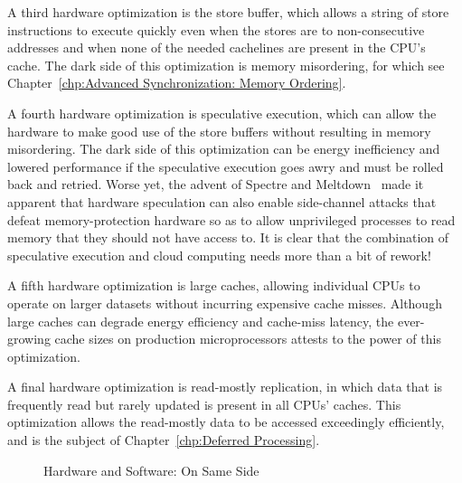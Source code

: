 A third hardware optimization is the store buffer, which allows a string
of store instructions to execute quickly even when the stores are to
non-consecutive addresses and when none of the needed cachelines are
present in the CPU's cache.
The dark side of this optimization is memory misordering, for which see
Chapter~\ref{chp:Advanced Synchronization: Memory Ordering}.

A fourth hardware optimization is speculative execution, which can
allow the hardware to make good use of the store buffers without
resulting in memory misordering.
The dark side of this optimization can be energy inefficiency and
lowered performance if the speculative execution goes awry and must
be rolled back and retried.
Worse yet, the advent of
Spectre and Meltdown~\cite{JannHorn2018MeltdownSpectre}
made it apparent that hardware speculation can also enable side-channel
attacks that defeat memory-protection hardware so as to allow unprivileged
processes to read memory that they should not have access to.
It is clear that the combination of speculative execution and cloud
computing needs more than a bit of rework!

A fifth hardware optimization is large caches, allowing individual
CPUs to operate on larger datasets without incurring expensive cache
misses.
Although large caches can degrade energy efficiency and cache-miss
latency, the ever-growing cache sizes on production microprocessors
attests to the power of this optimization.

A final hardware optimization is read-mostly replication, in which
data that is frequently read but rarely updated is present in all
CPUs' caches.
This optimization allows the read-mostly data to be accessed
exceedingly efficiently, and is the subject of
Chapter~\ref{chp:Deferred Processing}.

\begin{figure}[tb]
\centering
{}
\caption{Hardware and Software: On Same Side}
\end{figure}

